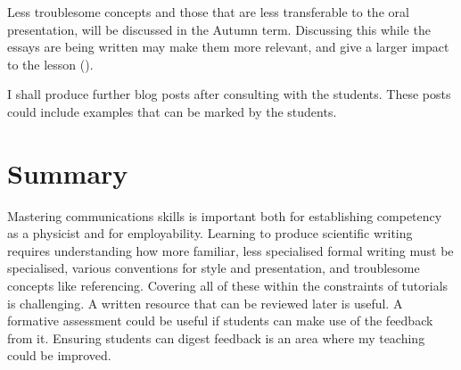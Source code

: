 Less troublesome concepts and those that are less transferable to the oral presentation, will be discussed in the Autumn term. Discussing this while the essays are being written may make them more relevant, and give a larger impact to the lesson ().

I shall produce further blog posts after consulting with the students. These posts could include examples that can be marked by the students.

\section{Summary}

Mastering communications skills is important both for establishing competency as a physicist and for employability. Learning to produce scientific writing requires understanding how more familiar, less specialised formal writing must be specialised, various conventions for style and presentation, and troublesome concepts like referencing. Covering all of these within the constraints of tutorials is challenging. A written resource that can be reviewed later is useful. A formative assessment could be useful if students can make use of the feedback from it. Ensuring students can digest feedback is an area where my teaching could be improved.
